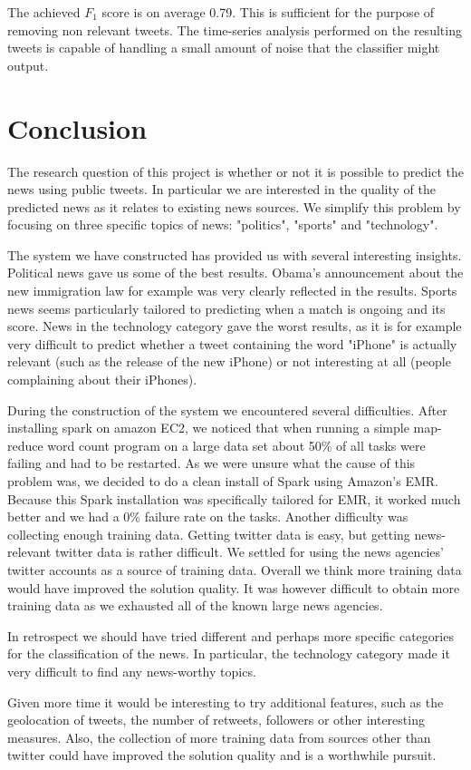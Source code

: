 \documentclass{llncs}
\begin{document}
The achieved $F_1$ score is on average 0.79. This is sufficient for the purpose of removing non relevant tweets. The time-series analysis performed on the resulting tweets is capable of handling a small amount of noise that the classifier might output.

\section{Conclusion}
The research question of this project is whether or not it is possible to predict the news using public tweets. In particular we are interested in the quality of the predicted news as it relates to existing news sources. We simplify this problem by focusing on three specific topics of news: "politics", "sports" and "technology".

The system we have constructed has provided us with several interesting insights. Political news gave us some of the best results. Obama's announcement about the new immigration law for example was very clearly reflected in the results. Sports news seems particularly tailored to predicting when a match is ongoing and its score. News in the technology category gave the worst results, as it is for example very difficult to predict whether a tweet containing the word "iPhone" is actually relevant (such as the release of the new iPhone) or not interesting at all (people complaining about their iPhones).

During the construction of the system we encountered several difficulties. After installing spark on amazon EC2, we noticed that when running a simple map-reduce word count program on a large data set about 50\% of all tasks were failing and had to be restarted. As we were unsure what the cause of this problem was, we decided to do a clean install of Spark using Amazon's EMR. Because this Spark installation was specifically tailored for EMR, it worked much better and we had a 0\% failure rate on the tasks. Another difficulty was collecting enough training data. Getting twitter data is easy, but getting news-relevant twitter data is rather difficult. We settled for using the news agencies' twitter accounts as a source of training data. Overall we think more training data would have improved the solution quality. It was however difficult to obtain more training data as we exhausted all of the known large news agencies.

In retrospect we should have tried different and perhaps more specific categories for the classification of the news. In particular, the technology category made it very difficult to find any news-worthy topics.

Given more time it would be interesting to try additional features, such as the geolocation of tweets, the number of retweets, followers or other interesting measures. Also, the collection of more training data from sources other than twitter could have improved the solution quality and is a worthwhile pursuit.



\end{document}
